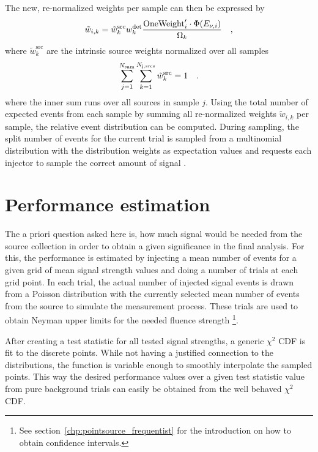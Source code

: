 The new, re-normalized weights per sample can then be expressed by
\begin{equation}
    \tilde{w}_{i,k}
    = \tilde{w}_k^\text{src} w_k^\text{det}
      \frac{\text{OneWeight}'_i \cdot \Phi(E_{\nu,i})}{\Omega_k}
  \quad\text{,}
\end{equation}
where $\tilde{w}_k^\text{src}$ are the intrinsic source weights normalized over all samples
\begin{equation}
  \sum_{j=1}^{N_\text{sam}} \sum_{k=1}^{N_\text{j,srcs}}
  \tilde{w}_k^\text{src} = 1
  \quad\text{.}
\end{equation}
where the inner sum runs over all sources in sample $j$.
Using the total number of expected events from each sample by summing all re-normalized weights $\tilde{w}_{i,k}$ per sample, the relative event distribution can be computed.
During sampling, the split number of events for the current trial is sampled from a multinomial distribution with the distribution weights as expectation values and requests each injector to sample the correct amount of signal \cite{BOHM20141}.


\section{Performance estimation}
The a priori question asked here is, how much signal would be needed from the source collection in order to obtain a given significance in the final analysis.
For this, the performance is estimated by injecting a mean number of events for a given grid of mean signal strength values and doing a number of trials at each grid point.
In each trial, the actual number of injected signal events is drawn from a Poisson distribution with the currently selected mean number of events from the source to simulate the measurement process.
These trials are used to obtain Neyman upper limits for the needed fluence strength \footnote{See section~\ref{chp:pointsource_frequentist} for the introduction on how to obtain confidence intervals.}.

After creating a test statistic for all tested signal strengths, a generic $\chi^2$ CDF is fit to the discrete points.
While not having a justified connection to the distributions, the function is variable enough to smoothly interpolate the sampled points.
This way the desired performance values over a given test statistic value from pure background trials can easily be obtained from the well behaved $\chi^2$ CDF.

